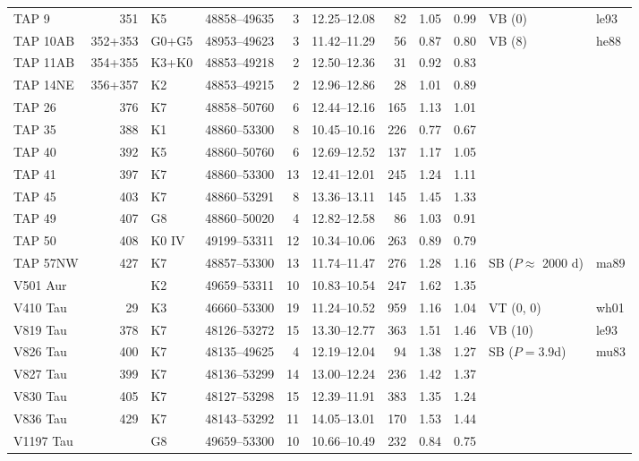 \begin{table}
{\begin{tabular}{lrllrcrllll}
TAP 9     & 351 & K5    & 48858--49635 &  3 & 12.25--12.08 &  82 & 1.05 & 0.99 & VB
(0\farcs61) & le93 \\
TAP 10AB &352+353& G0+G5& 48953--49623 &  3 & 11.42--11.29 &  56 & 0.87 & 0.80 & VB
(8\farcs6) & he88\\
TAP 11AB &354+355& K3+K0& 48853--49218 &  2 & 12.50--12.36 &  31 & 0.92 & 0.83 & & \\
TAP 14NE &356+357& K2   & 48853--49215 &  2 & 12.96--12.86 &  28 & 1.01 & 0.89 & & \\
TAP 26    & 376 & K7    & 48858--50760 &  6 & 12.44--12.16 & 165 & 1.13 & 1.01 & & \\
TAP 35    & 388 & K1    & 48860--53300 &  8 & 10.45--10.16 & 226 & 0.77 & 0.67 & & \\
TAP 40    & 392 & K5    & 48860--50760 &  6 & 12.69--12.52 & 137 & 1.17 & 1.05 & & \\
TAP 41    & 397 & K7    & 48860--53300 & 13 & 12.41--12.01 & 245 & 1.24 & 1.11 & & \\
TAP 45    & 403 & K7    & 48860--53291 &  8 & 13.36--13.11 & 145 & 1.45 & 1.33 & & \\
TAP 49    & 407 & G8    & 48860--50020 &  4 & 12.82--12.58 &  86 & 1.03 & 0.91 & & \\
TAP 50    & 408 & K0 IV & 49199--53311 & 12 & 10.34--10.06 & 263 & 0.89 & 0.79 & & \\
TAP 57NW  & 427 & K7    & 48857--53300 & 13 & 11.74--11.47 & 276 & 1.28 & 1.16 & SB
($P\approx$ 2000 d) & ma89\\
V501 Aur  &     & K2    & 49659--53311 & 10 & 10.83--10.54 & 247 & 1.62 & 1.35 & & \\
V410 Tau  &  29 & K3    & 46660--53300 & 19 & 11.24--10.52 & 959 & 1.16 & 1.04 & VT
(0\farcs07, 0\farcs29) & wh01 \\
V819 Tau  & 378 & K7    & 48126--53272 & 15 & 13.30--12.77 & 363 & 1.51 & 1.46 & VB
(10\farcs5) & le93\\
V826 Tau  & 400 & K7    & 48135--49625 &  4 & 12.19--12.04 &  94 & 1.38 & 1.27 & SB
($P=3.9$d) & mu83 \\
V827 Tau  & 399 & K7    & 48136--53299 & 14 & 13.00--12.24 & 236 & 1.42 & 1.37 & & \\
V830 Tau  & 405 & K7    & 48127--53298 & 15 & 12.39--11.91 & 383 & 1.35 & 1.24 & & \\
V836 Tau  & 429 & K7    & 48143--53292 & 11 & 14.05--13.01 & 170 & 1.53 & 1.44 & & \\
V1197 Tau &     & G8    & 49659--53300 & 10 & 10.66--10.49 & 232 & 0.84 & 0.75 & & \\

\end{tabular}}
\end{table}
